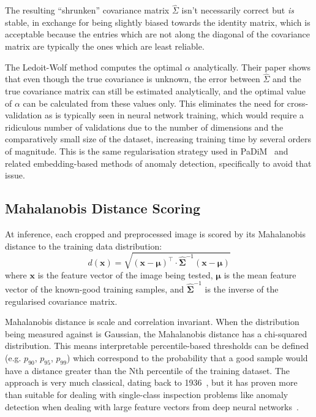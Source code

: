 \documentclass[conference]{IEEEtran}
\begin{document}
The resulting ``shrunken'' covariance matrix $\hat{\Sigma}$ isn't necessarily correct but \emph{is} stable, in exchange for being slightly biased towards the identity matrix, which is acceptable because the entries which are not along the diagonal of the covariance matrix are typically the ones which are least reliable.

The Ledoit-Wolf method computes the optimal $\alpha$ analytically. Their paper shows that even though the true covariance is unknown, the error between $\hat{\Sigma}$ and the true covariance matrix can still be estimated analytically, and the optimal value of $\alpha$ can be calculated from these values only. This eliminates the need for cross-validation as is typically seen in neural network training, which would require a ridiculous number of validations due to the number of dimensions and the comparatively small size of the dataset, increasing training time by several orders of magnitude. This is the same regularisation strategy used in PaDiM~\cite{defard2021padim} and related embedding-based methods of anomaly detection, specifically to avoid that issue.

\subsection{Mahalanobis Distance Scoring}
At inference, each cropped and preprocessed image is scored by its Mahalanobis distance to the training data distribution:
\begin{equation}
    d(\mathbf{x}) = \sqrt{(\mathbf{x}-\boldsymbol{\mu})^\top \cdot
    \hat{\boldsymbol{\Sigma}}^{-1}(\mathbf{x}-\boldsymbol{\mu})}
\end{equation}
where $\mathbf{x}$ is the feature vector of the image being tested,
$\boldsymbol{\mu}$ is the mean feature vector of the known-good training
samples, and $\hat{\boldsymbol{\Sigma}}^{-1}$ is the inverse of the
regularised covariance matrix.

Mahalanobis distance is scale and correlation invariant. When the distribution being measured against is Gaussian, the Mahalanobis distance has a chi-squared distribution. This means interpretable percentile-based thresholds can be defined (e.g. $p_{90}$, $p_{95}$, $p_{99}$) which correspond to the probability that a good sample would have a distance greater than the Nth percentile of the training dataset. The approach is very much classical, dating back to 1936~\cite{mahalanobis1936generalised}, but it has proven more than suitable for dealing with single-class inspection problems like anomaly detection when dealing with large feature vectors from deep neural networks~\cite{lee2018simple,roth2022towards}.
\end{document}
